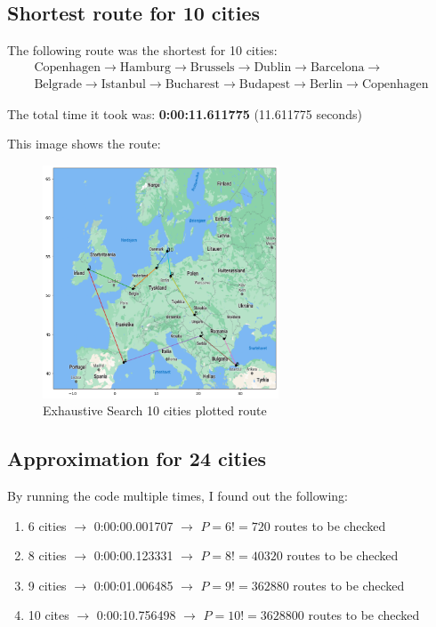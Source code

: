 \documentclass{article}
\begin{document}
    \subsection{Shortest route for 10 cities}

    The following route was the shortest for 10 cities: 
    \[
    \begin{aligned}
        \text{Copenhagen} \to \text{Hamburg} \to \text{Brussels} \to \text{Dublin} \to \text{Barcelona} \to \\
        \text{Belgrade} \to \text{Istanbul} \to \text{Bucharest} \to \text{Budapest} \to \text{Berlin} \to \text{Copenhagen}
    \end{aligned}
    \]

    The total time it took was: \textbf{0:00:11.611775} (11.611775 seconds)

    This image shows the route:

    \begin{figure}[h!]
        \includegraphics[width=7cm]{images/exhaustive_search_result_10_cities.png}
        \centering
        \caption{Exhaustive Search 10 cities plotted route}
    \end{figure}

    \newpage

    \subsection{Approximation for 24 cities}

    By running the code multiple times, I found out the following: 

    \begin{enumerate}
        \item 6 cities $\to$ 0:00:00.001707 $\to$ $P = 6! = 720$ routes to be checked 
        \item 8 cities $\to$ 0:00:00.123331 $\to$ $P = 8! = 40320$ routes to be checked 
        \item 9 cities $\to$ 0:00:01.006485 $\to$ $P = 9! = 362880$ routes to be checked 
        \item 10 cites $\to$ 0:00:10.756498 $\to$ $P = 10! = 3628800$ routes to be checked 
    \end{enumerate}
\end{document}

